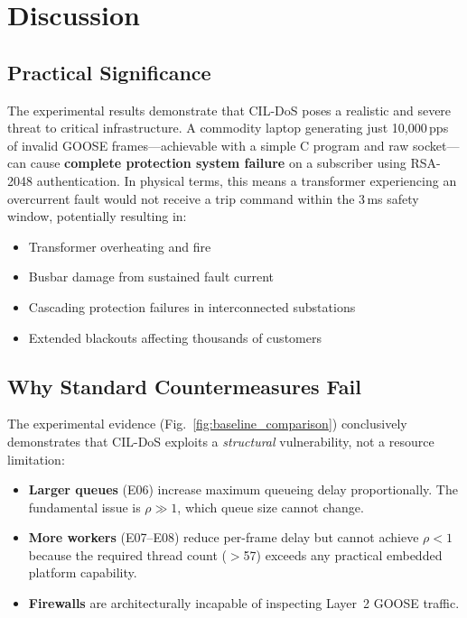 \documentclass{ieeeaccess}
\begin{document}
\section{Discussion}

\subsection{Practical Significance}
The experimental results demonstrate that CIL-DoS poses a realistic and severe threat to critical infrastructure. A commodity laptop generating just 10,000\,pps of invalid GOOSE frames---achievable with a simple C program and raw socket---can cause \textbf{complete protection system failure} on a subscriber using RSA-2048 authentication. In physical terms, this means a transformer experiencing an overcurrent fault would not receive a trip command within the 3\,ms safety window, potentially resulting in:
\begin{itemize}[leftmargin=*]
    \item Transformer overheating and fire
    \item Busbar damage from sustained fault current
    \item Cascading protection failures in interconnected substations
    \item Extended blackouts affecting thousands of customers
\end{itemize}

\subsection{Why Standard Countermeasures Fail}
The experimental evidence (Fig.~\ref{fig:baseline_comparison}) conclusively demonstrates that CIL-DoS exploits a \emph{structural} vulnerability, not a resource limitation:
\begin{itemize}[leftmargin=*]
    \item \textbf{Larger queues} (E06) increase maximum queueing delay proportionally. The fundamental issue is $\rho \gg 1$, which queue size cannot change.
    \item \textbf{More workers} (E07--E08) reduce per-frame delay but cannot achieve $\rho < 1$ because the required thread count ($>$57) exceeds any practical embedded platform capability.
    \item \textbf{Firewalls} are architecturally incapable of inspecting Layer~2 GOOSE traffic.
\end{itemize}
\end{document}
